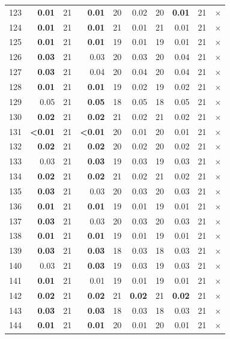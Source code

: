 \begin{longtable}{lr@{\hskip 4pt}l@{\hskip 12pt}r@{\hskip 4pt}l@{\hskip 12pt}r@{\hskip 4pt}l@{\hskip 12pt}r@{\hskip 4pt}l@{\hskip 12pt}r}
123 & \textbf{0.01} & 21 & \textbf{0.01} & 20 & 0.02 & 20 & \textbf{0.01} & 21 & $\times$ \\
124 & \textbf{0.01} & 21 & \textbf{0.01} & 21 & 0.01 & 21 & 0.01 & 21 & $\times$ \\
125 & \textbf{0.01} & 21 & \textbf{0.01} & 19 & 0.01 & 19 & 0.01 & 21 & $\times$ \\
126 & \textbf{0.03} & 21 & 0.03 & 20 & 0.03 & 20 & 0.04 & 21 & $\times$ \\
127 & \textbf{0.03} & 21 & 0.04 & 20 & 0.04 & 20 & 0.04 & 21 & $\times$ \\
128 & \textbf{0.01} & 21 & \textbf{0.01} & 19 & 0.02 & 19 & 0.02 & 21 & $\times$ \\
129 & 0.05 & 21 & \textbf{0.05} & 18 & 0.05 & 18 & 0.05 & 21 & $\times$ \\
130 & \textbf{0.02} & 21 & \textbf{0.02} & 21 & 0.02 & 21 & 0.02 & 21 & $\times$ \\
131 & \textbf{<0.01} & 21 & \textbf{<0.01} & 20 & 0.01 & 20 & 0.01 & 21 & $\times$ \\
132 & \textbf{0.02} & 21 & \textbf{0.02} & 20 & 0.02 & 20 & 0.02 & 21 & $\times$ \\
133 & 0.03 & 21 & \textbf{0.03} & 19 & 0.03 & 19 & 0.03 & 21 & $\times$ \\
134 & \textbf{0.02} & 21 & \textbf{0.02} & 21 & 0.02 & 21 & 0.02 & 21 & $\times$ \\
135 & \textbf{0.03} & 21 & 0.03 & 20 & 0.03 & 20 & 0.03 & 21 & $\times$ \\
136 & \textbf{0.01} & 21 & \textbf{0.01} & 19 & 0.01 & 19 & 0.01 & 21 & $\times$ \\
137 & \textbf{0.03} & 21 & 0.03 & 20 & 0.03 & 20 & 0.03 & 21 & $\times$ \\
138 & \textbf{0.01} & 21 & \textbf{0.01} & 19 & 0.01 & 19 & 0.01 & 21 & $\times$ \\
139 & \textbf{0.03} & 21 & \textbf{0.03} & 18 & 0.03 & 18 & 0.03 & 21 & $\times$ \\
140 & 0.03 & 21 & \textbf{0.03} & 19 & 0.03 & 19 & 0.03 & 21 & $\times$ \\
141 & \textbf{0.01} & 21 & 0.01 & 19 & 0.01 & 19 & 0.01 & 21 & $\times$ \\
142 & \textbf{0.02} & 21 & \textbf{0.02} & 21 & \textbf{0.02} & 21 & \textbf{0.02} & 21 & $\times$ \\
143 & \textbf{0.03} & 21 & \textbf{0.03} & 18 & 0.03 & 18 & 0.03 & 21 & $\times$ \\
144 & \textbf{0.01} & 21 & \textbf{0.01} & 20 & 0.01 & 20 & 0.01 & 21 & $\times$ \\

\end{longtable}

